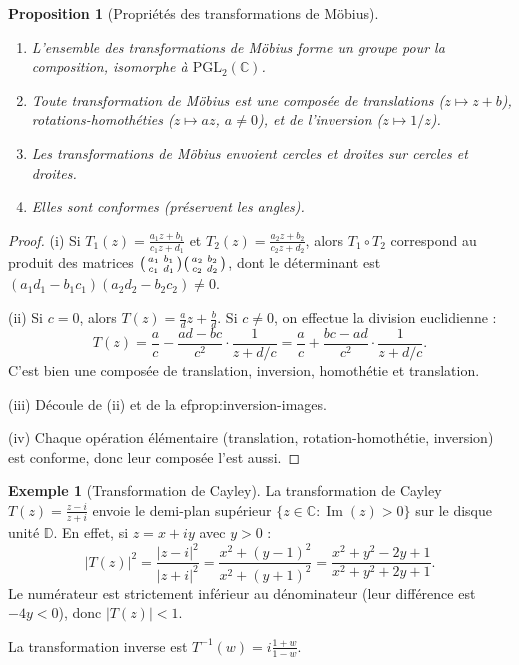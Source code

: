 \documentclass[12pt,a4paper,openany]{book}
\theoremstyle{definition}
\newtheorem{exemple}[definition]{Exemple}
\theoremstyle{plain}
\newtheorem{proposition}[definition]{Proposition}
\theoremstyle{remark}
\newcommand{\C}{\mathbb{C}}
\newcommand{\D}{\mathbb{D}}
\DeclareMathOperator{\im}{Im}
\newcommand{\abs}[1]{\left|#1\right|}
\begin{document}
\begin{proposition}[Propriétés des transformations de Möbius]\label{prop:mobius-proprietes}
\begin{enumerate}[label=(\roman*)]
  \item L'ensemble des transformations de Möbius forme un groupe pour la composition, isomorphe à $\mathrm{PGL}_2(\C)$.
  \item Toute transformation de Möbius est une composée de translations ($z \mapsto z + b$), rotations-homothéties ($z \mapsto az$, $a \neq 0$), et de l'inversion ($z \mapsto 1/z$).
  \item Les transformations de Möbius envoient cercles et droites sur cercles et droites.
  \item Elles sont conformes (préservent les angles).
\end{enumerate}
\end{proposition}

\begin{proof}
(i) Si $T_1(z) = \frac{a_1 z + b_1}{c_1 z + d_1}$ et $T_2(z) = \frac{a_2 z + b_2}{c_2 z + d_2}$, alors $T_1 \circ T_2$ correspond au produit des matrices $\begin{psmallmatrix}a_1 & b_1 \\ c_1 & d_1\end{psmallmatrix}\begin{psmallmatrix}a_2 & b_2 \\ c_2 & d_2\end{psmallmatrix}$, dont le déterminant est $(a_1d_1 - b_1c_1)(a_2d_2 - b_2c_2) \neq 0$.

(ii) Si $c = 0$, alors $T(z) = \frac{a}{d}z + \frac{b}{d}$. Si $c \neq 0$, on effectue la division euclidienne :
\[
  T(z) = \frac{a}{c} - \frac{ad - bc}{c^2}\cdot\frac{1}{z + d/c} = \frac{a}{c} + \frac{bc-ad}{c^2}\cdot\frac{1}{z+d/c}.
\]
C'est bien une composée de translation, inversion, homothétie et translation.

(iii) Découle de (ii) et de la 
ef{prop:inversion-images}.

(iv) Chaque opération élémentaire (translation, rotation-homothétie, inversion) est conforme, donc leur composée l'est aussi.
\end{proof}

\begin{exemple}[Transformation de Cayley]\label{ex:cayley}
La transformation de Cayley $T(z) = \frac{z - i}{z + i}$ envoie le demi-plan supérieur $\{z \in \C : \im(z) > 0\}$ sur le disque unité $\D$. En effet, si $z = x + iy$ avec $y > 0$ :
\[
  \abs{T(z)}^2 = \frac{\abs{z-i}^2}{\abs{z+i}^2} = \frac{x^2 + (y-1)^2}{x^2 + (y+1)^2} = \frac{x^2+y^2-2y+1}{x^2+y^2+2y+1}.
\]
Le numérateur est strictement inférieur au dénominateur (leur différence est $-4y < 0$), donc $\abs{T(z)} < 1$.

La transformation inverse est $T^{-1}(w) = i\frac{1+w}{1-w}$.
\end{exemple}
\end{document}
